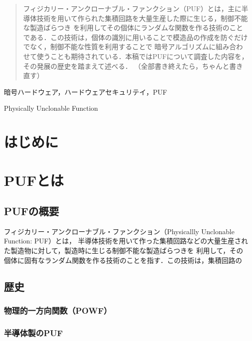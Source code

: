 \documentclass[survey]{ieicej}%
\begin{document}
\begin{abstract}
  フィジカリー・アンクローナブル・ファンクション（PUF）とは，主に半導体技術を用いて作られた集積回路を大量生産した際に生じる，制御不能な製造ばらつき
  を利用してその個体にランダムな関数を作る技術のことである．この技術は，個体の識別に用いることで模造品の作成を防ぐだけでなく，制御不能な性質を利用することで
  暗号アルゴリズムに組み合わせて使うことも期待されている．本稿ではPUFについて調査した内容を，その発展の歴史を踏まえて述べる．
  （全部書き終えたら，ちゃんと書き直す）
\end{abstract}
\begin{keyword}
  暗号ハードウェア，ハードウェアセキュリテイ，PUF
\end{keyword}
\begin{eabstract}
\end{eabstract}
\begin{ekeyword}
  Physically Unclonable Function
\end{ekeyword}
\maketitle

\section{はじめに}


\section{PUFとは}
\subsection{PUFの概要}
フィジカリー・アンクローナブル・ファンクション（Physicallly Unclonable Function: PUF）とは，
半導体技術を用いて作った集積回路などの大量生産された製造物に対して，製造時に生じる制御不能な製造ばらつきを
利用して，その個体に固有なランダム関数を作る技術のことを指す．この技術は，集積回路の
\subsection{歴史}
\subsubsection{物理的一方向関数（POWF）}
\subsubsection{半導体製のPUF}
\end{document}
